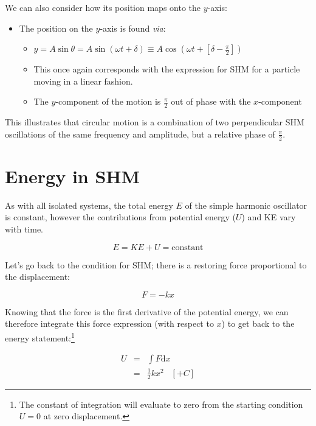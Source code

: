 \documentclass[
]{book}
\providecommand{\tightlist}{%
  \setlength{\itemsep}{0pt}\setlength{\parskip}{0pt}}
\begin{document}
We can also consider how its position maps onto the \(y\)-axis:

\begin{itemize}
\tightlist
\item
  The position on the \(y\)-axis is found \emph{via}:

  \begin{itemize}
  \tightlist
  \item
    \(y = A \sin \theta = A \sin (\omega t + \delta) \equiv A \cos(\omega t + [\delta - \frac{\pi}{2}])\)
  \item
    This once again corresponds with the expression for SHM for a particle moving in a linear fashion.
  \item
    The \(y\)-component of the motion is \(\frac{\pi}{2}\) out of phase with the \(x\)-component
  \end{itemize}
\end{itemize}

This illustrates that circular motion is a combination of two perpendicular SHM oscillations of the same frequency and amplitude, but a relative phase of \(\frac{\pi}{2}\).

\hypertarget{sec:ch1-shm-energy1}{%
\section{Energy in SHM}\label{sec:ch1-shm-energy1}}

As with all isolated systems, the total energy \(E\) of the simple harmonic oscillator is constant, however the contributions from potential energy (\(U\)) and KE vary with time.

\begin{equation}
E = KE + U = \textrm{constant}
\end{equation}

Let's go back to the condition for SHM; there is a restoring force proportional to the displacement:

\begin{equation}
F = -kx
\end{equation}

Knowing that the force is the first derivative of the potential energy, we can therefore integrate this force expression (with respect to \(x\)) to get back to the energy statement:\footnote{The constant of integration will evaluate to zero from the starting condition \(U = 0\) at zero displacement.}

\begin{equation}
\begin{array}{rcl}
U &=& \int F \mathrm{d}x \\
& =& \frac{1}{2}kx^2 \hspace{10pt} [+C]
\end{array}
\label{eq:ch1-potentialfromforce1}
\end{equation}
\end{document}
